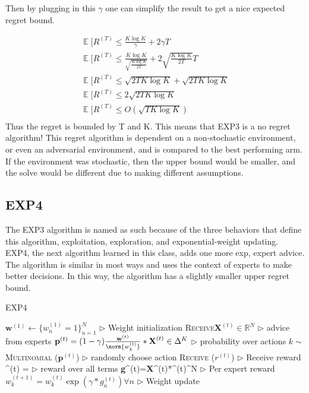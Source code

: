 \documentclass[11pt]{article}
\DeclareMathOperator*{\E}{\mathbb{E}}
\begin{document}
Then by plugging in this $\gamma$ one can simplify the result to get a nice expected regret bound.

\begin{align}
    \E[R^{(T)}\leq \frac{K\log K}{\gamma}+2\gamma T\\
    \E[R^{(T)}\leq \frac{K\log K}{\sqrt{\frac{K\log K}{2T}}}+2\sqrt{\frac{K\log K}{2T}} T\\
    \E[R^{(T)}\leq \sqrt{2T K\log K}+\sqrt{2T K\log K}\\
    \E[R^{(T)}\leq 2\sqrt{2T K\log K}\\
    \E[R^{(T)}\leq O(\sqrt{T K\log K})\label{eq:exp3regretbound}\\
\end{align}
Thus the regret is bounded by T and K. This means that EXP3 is a no regret algorithm! This regret algorithm is dependent on a non-stochastic environment, or even an adversarial environment, and is compared to the best performing arm. If the environment was stochastic, then the upper bound would be smaller, and the solve would be different due to making different assumptions. 

\subsection{EXP4}
The EXP3 algorithm is named as such because of the three behaviors that define this algorithm, exploitation, exploration, and exponential-weight updating. EXP4, the next algorithm learned in this class, adds one more exp, expert advice. The algorithm is similar in most ways and uses the context of experts to make better decisions. In this way, the algorithm has a slightly smaller upper regret bound.

\begin{algorithm}[H]
\caption{EXP4}
\label{algo:EXP4}
\begin{algorithmic}[1]
\STATE $\textbf{w}^{(1)} \leftarrow \{w_n^{(1)}=1\}_{n=1}^N$ \hfill $\triangleright$ Weight initialization
\STATE \textsc{Receive}$\textbf{X}^{(t)}\in \mathbb{R}^N$ \hfill $\triangleright$ advice from experts
\STATE $\textbf{p}^{(t)}=(1-\gamma)\frac{\textbf{w}^{(t)}}{\norm{w_k^{(t)}}}*\textbf{X}^{(t)}\in \Delta^K$ \hfill $\triangleright$ probability over actions
\STATE $k \sim$\textsc{Multinomial} ($\textbf{p}^{(t)}$) \hfill $\triangleright$ randomly choose action
\STATE \textsc{Receive} ($r^{(t)}$) \hfill $\triangleright$ Receive reward
\STATE {}^{(t)} =  \hfill $\triangleright$ reward over all terms
\STATE \textbf{g}^{(t)}=\textbf{X}^{(t)}*^{(t)}\in {}^N   \hfill $\triangleright$ Per expert reward
\STATE $w_k^{(t+1)} = w_k^{(t)}\exp(\gamma*g_n^{(t)})  \forall n$ \hfill $\triangleright$ Weight update
\ENDFOR
\end{algorithmic}
\end{algorithm}
\end{document}
